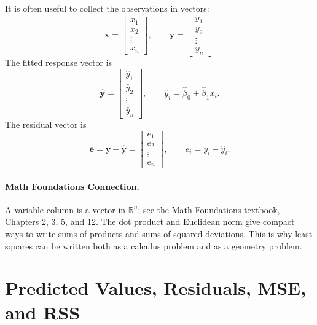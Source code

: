 It is often useful to collect the observations in vectors:
\begin{equation}
  \mathbf{x}=\begin{bmatrix}x_1\\x_2\\\vdots\\x_n\end{bmatrix},
  \qquad
  \mathbf{y}=\begin{bmatrix}y_1\\y_2\\\vdots\\y_n\end{bmatrix}.
\end{equation}
The fitted response vector is
\begin{equation}
  \widehat{\mathbf{y}}=\begin{bmatrix}\widehat{y}_1\\\widehat{y}_2\\\vdots\\\widehat{y}_n\end{bmatrix},
  \qquad
  \widehat{y}_i=\widehat{\beta}_0+\widehat{\beta}_1x_i.
\end{equation}
The residual vector is
\begin{equation}
  \mathbf{e}=\mathbf{y}-\widehat{\mathbf{y}}
  =\begin{bmatrix}e_1\\e_2\\\vdots\\e_n\end{bmatrix},
  \qquad
  e_i=y_i-\widehat{y}_i.
\end{equation}

\paragraph{Math Foundations Connection.}
A variable column is a vector in $\mathbb{R}^n$; see the Math Foundations textbook, Chapters 2, 3, 5, and 12.  The dot product and Euclidean norm give compact ways to write sums of products and sums of squared deviations.  This is why least squares can be written both as a calculus problem and as a geometry problem.

\section{Predicted Values, Residuals, MSE, and RSS}

